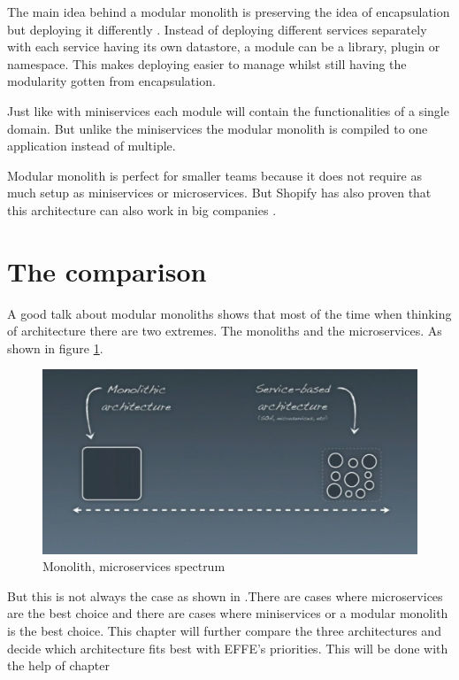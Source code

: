 The main idea behind a modular monolith is preserving the idea of encapsulation but deploying it differently \cite{modularMonolithIdea}. Instead of deploying different services separately with each service having its own datastore, a module can be a library, plugin or namespace. This makes deploying easier to manage whilst still having the modularity gotten from encapsulation.

Just like with miniservices each module will contain the functionalities of a single domain. But unlike the miniservices the modular monolith is compiled to one application instead of multiple.

Modular monolith is perfect for smaller teams because it does not require as much setup as miniservices or microservices. But Shopify has also proven that this architecture can also work in big companies \cite{shopifyModularMonolith}.

\section{The comparison}
\label{sec:Comparison}

A good talk about modular monoliths \cite{modularMonolithTalk} shows that most of the time when thinking of architecture there are two extremes. The monoliths and the microservices. As shown in figure \ref{fig:MonolithMicroservicesSpectrum}.
\begin{figure}[H]
	\includegraphics[width=\linewidth]{microservices-spectrum.png}
        \caption{Monolith, microservices spectrum \cite{modularMonolithTalk}}
        \label{fig:MonolithMicroservicesSpectrum}
\end{figure}

But this is not always the case as shown in .There are cases where microservices are the best choice and there are cases where miniservices or a modular monolith is the best choice. This chapter will further compare the three architectures and decide which architecture fits best with EFFE's priorities. This will be done with the help of chapter 


